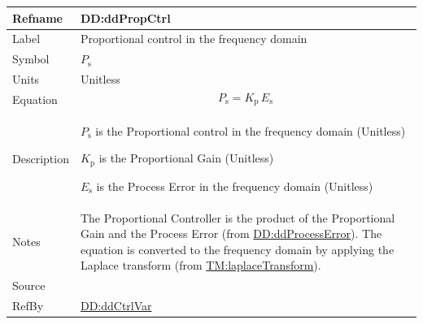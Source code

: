 \documentclass[12pt]{article}
\begin{document}
\medskip
\noindent
\begin{minipage}{\textwidth}
\begin{tabular}{>{\raggedright}p{}>{\raggedright\arraybackslash}p{}}
\toprule \textbf{Refname} & \textbf{DD:ddPropCtrl}
\label{DD:ddPropCtrl}
\\ \midrule
Label & Proportional control in the frequency domain
        
\\ \midrule
Symbol & ${P_{\text{s}}}$
         
\\ \midrule
Units & Unitless
        
\\ \midrule
Equation & \begin{displaymath}
           {P_{\text{s}}}={K_{\text{p}}}\,{E_{\text{s}}}
           \end{displaymath}
\\ \midrule
Description & \begin{symbDescription}
              \item{${P_{\text{s}}}$ is the Proportional control in the frequency domain (Unitless)}
              \item{${K_{\text{p}}}$ is the Proportional Gain (Unitless)}
              \item{${E_{\text{s}}}$ is the Process Error in the frequency domain (Unitless)}
              \end{symbDescription}
\\ \midrule
Notes & The Proportional Controller is the product of the Proportional Gain and the Process Error (from \hyperref[DD:ddProcessError]{DD:ddProcessError}). The equation is converted to the frequency domain by applying the Laplace transform (from \hyperref[TM:laplaceTransform]{TM:laplaceTransform}).
        
\\ \midrule
Source & \cite{johnson2008}
         
\\ \midrule
RefBy & \hyperref[DD:ddCtrlVar]{DD:ddCtrlVar}
        
\\ \bottomrule
\end{tabular}
\end{minipage}
\end{document}
